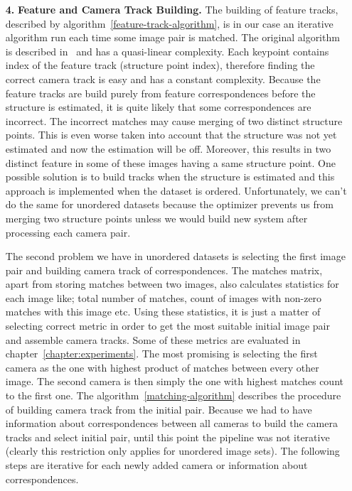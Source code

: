 \begin{itemize}
\item[\textbf{4.}] \textbf{Feature and Camera Track Building.}
The building of feature tracks, described by algorithm~\ref{feature-track-algorithm}, is in our case an iterative algorithm run each time some image pair is matched. The original algorithm is described in~\cite{feature-tracking} and has a quasi-linear complexity. Each keypoint contains index of the feature track (structure point index), therefore finding the correct camera track is easy and has a constant complexity. Because the feature tracks are build purely from feature correspondences before the structure is estimated, it is quite likely that some correspondences are incorrect. The incorrect matches may cause merging of two distinct structure points. This is even worse taken into account that the structure was not yet estimated and now the estimation will be off. Moreover, this results in two distinct feature in some of these images having a same structure point. One possible solution is to build tracks when the structure is estimated and this approach is implemented when the dataset is ordered. Unfortunately, we can't do the same for unordered datasets because the optimizer prevents us from merging two structure points unless we would build new system after processing each camera pair.

The second problem we have in unordered datasets is selecting the first image pair and building camera track of correspondences. The matches matrix, apart from storing matches between two images, also calculates statistics for each image like; total number of matches, count of images with non-zero matches with this image etc. Using these statistics, it is just a matter of selecting correct metric in order to get the most suitable initial image pair and assemble camera tracks. Some of these metrics are evaluated in chapter~\ref{chapter:experiments}. The most promising is selecting the first camera as the one with highest product of matches between every other image. The second camera is then simply the one with highest matches count to the first one. The algorithm~\ref{matching-algorithm} describes the procedure of building camera track from the initial pair. Because we had to have information about correspondences between all cameras to build the camera tracks and select initial pair, until this point the pipeline was not iterative (clearly this restriction only applies for unordered image sets). The following steps are iterative for each newly added camera or information about correspondences. 


\end{itemize}
